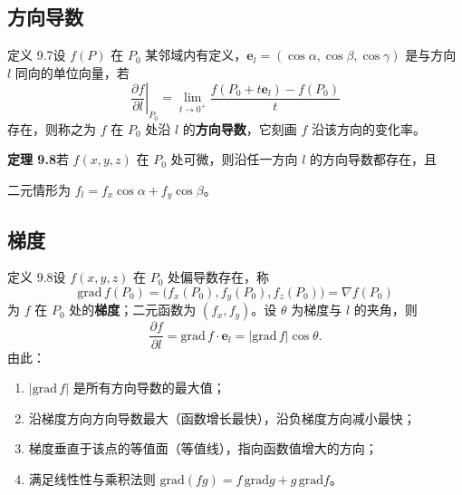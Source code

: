 \subsection{方向导数}

定义 9.7\quad 设 $f(P)$ 在 $P_0$ 某邻域内有定义，$\boldsymbol e_l=(\cos\alpha,\cos\beta,\cos\gamma)$ 是与方向 $l$ 同向的单位向量，若
\begin{equation}
\left.\frac{\partial f}{\partial l}\right|_{P_0}
=\lim_{t\to0^{+}}\frac{f(P_0+t\boldsymbol e_l)-f(P_0)}{t}
\end{equation}
存在，则称之为 $f$ 在 $P_0$ 处沿 $l$ 的\textbf{方向导数}，它刻画 $f$ 沿该方向的变化率。

\textbf{定理 9.8}\quad 若 $f(x,y,z)$ 在 $P_0$ 处可微，则沿任一方向 $l$ 的方向导数都存在，且


二元情形为 $f_l=f_x\cos\alpha+f_y\cos\beta$。


\subsection{梯度}

定义 9.8\quad 设 $f(x,y,z)$ 在 $P_0$ 处偏导数存在，称
\begin{equation}
\mathrm{grad}\,f(P_0)=\bigl(f_x(P_0),f_y(P_0),f_z(P_0)\bigr)=\nabla f(P_0)
\end{equation}
为 $f$ 在 $P_0$ 处的\textbf{梯度}；二元函数为 $(f_x,f_y)$。设 $\theta$ 为梯度与 $l$ 的夹角，则
\begin{equation}
\frac{\partial f}{\partial l}=\mathrm{grad}\,f\cdot\boldsymbol e_l=|\mathrm{grad}\,f|\cos\theta .
\end{equation}
由此：
\begin{enumerate}
  \item $|\mathrm{grad}\,f|$ 是所有方向导数的最大值；
  \item 沿梯度方向方向导数最大（函数增长最快），沿负梯度方向减小最快；
  \item 梯度垂直于该点的等值面（等值线），指向函数值增大的方向；
  \item 满足线性性与乘积法则 $\mathrm{grad}(fg)=f\,\mathrm{grad}g+g\,\mathrm{grad}f$。
\end{enumerate}

